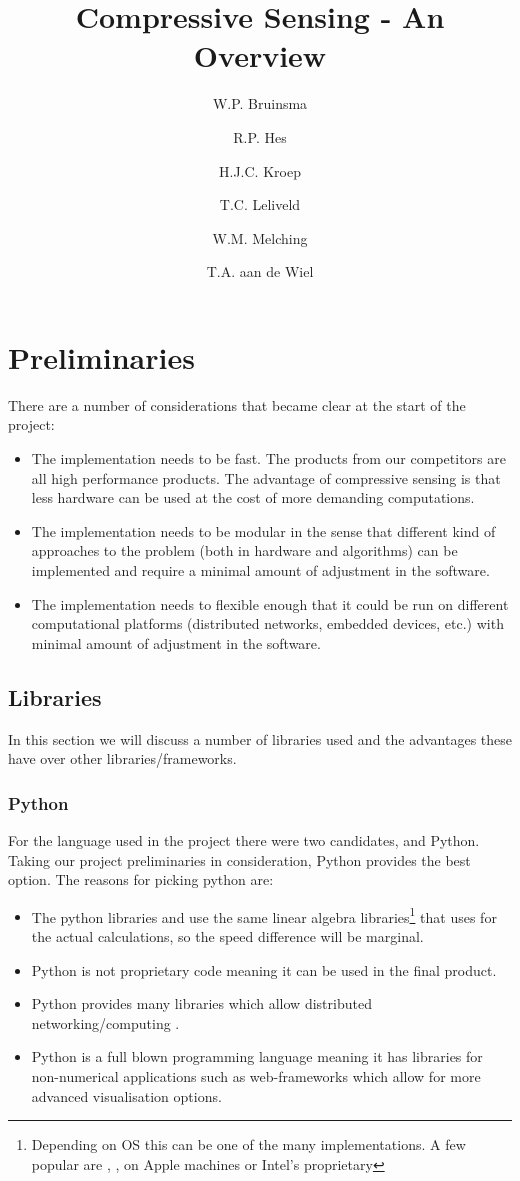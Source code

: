 \documentclass[a4paper, openany, oneside]{memoir}
\title{Compressive Sensing - An Overview}
\author{W.P. Bruinsma \and R.P. Hes \and H.J.C. Kroep \and T.C. Leliveld \and W.M. Melching \and T.A. aan de Wiel}
\begin{document}
\chapter{Preliminaries}
There are a number of considerations that became clear at the start of the project:
\begin{itemize}
    \item The implementation needs to be fast. The products from our competitors are all high performance products. The advantage of compressive sensing is that less hardware can be used at the cost of more demanding computations.
    \item The implementation needs to be modular in the sense that different kind of approaches to the problem (both in hardware and algorithms) can be implemented and require a minimal amount of adjustment in the software.
    \item The implementation needs to flexible enough that it could be run on different computational platforms (distributed networks, embedded devices, etc.) with minimal amount of adjustment in the software.
\end{itemize}

\section{Libraries}
\label{sec:libraries}
In this section we will discuss a number of libraries used and the advantages these have over other libraries/frameworks.

\subsection{Python}
\label{sec:python}
For the language used in the project there were two candidates, \matlab{} and Python. Taking our project preliminaries in consideration, Python provides the best option. The reasons for picking python are:
\begin{itemize}
    \item The python libraries  and  use the same linear algebra libraries\footnote{Depending on OS this can be one of the many implementations. A few popular are , ,  on Apple machines or Intel's proprietary } that \matlab{} uses for the actual calculations, so the speed difference will be marginal.
    \item Python is not proprietary code meaning it can be used in the final product.
    \item Python provides many libraries which allow distributed networking/computing \cite{pythonmp}.
    \item Python is a full blown programming language meaning it has libraries for non-numerical applications such as web-frameworks which allow for more advanced visualisation options.
\end{itemize}
\end{document}
